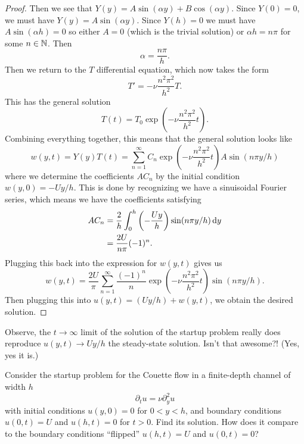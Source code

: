 \begin{framed}
\begin{proof}
Then we see that $Y(y)=A\sin(\alpha y)+B\cos(\alpha y)$. Since $Y(0)=0$,
we must have $Y(y)=A\sin(\alpha y)$. Since $Y(h)=0$ we must have
$A\sin(\alpha h)=0$ so either $A=0$ (which is the trivial solution) or
$\alpha h=n\pi$ for some $n\in\mathbb{N}$. Then
\begin{equation}
\alpha = \frac{n\pi}{h}.
\end{equation}
Then we return to the $T$ differential equation, which now takes the
form
\begin{equation}
T' = -\nu\frac{n^{2}\pi^{2}}{h^{2}}T.
\end{equation}
This has the general solution
\begin{equation}
T(t)=T_{0}\exp\left(-\nu\frac{n^{2}\pi^{2}}{h^{2}}t\right).
\end{equation}
Combining everything together, this means that the general solution
looks like
\begin{equation}
w(y,t)=Y(y)T(t)=\sum^{\infty}_{n=1}C_{n}\exp\left(-\nu\frac{n^{2}\pi^{2}}{h^{2}}t\right)A\sin(n\pi y/h)
\end{equation}
where we determine the coefficients $AC_{n}$ by the initial condition
$w(y,0)=-Uy/h$. This is done by recognizing we have a sinuisoidal
Fourier series, which means we have the coefficients satisfying
\begin{subequations}
  \begin{align}
AC_{n} &= \frac{2}{h}\int^{h}_{0}\left(-\frac{Uy}{h}\right)\sin(n\pi y/h)\,\mathrm{d} y\\
&=\frac{2 U}{n\pi}(-1)^{n}.
  \end{align}
\end{subequations}
Plugging this back into the expression for $w(y,t)$ gives us
\begin{equation}
w(y,t) = \frac{2U}{\pi}\sum^{\infty}_{n=1}\frac{(-1)^{n}}{n}\exp\left(-\nu\frac{n^{2}\pi^{2}}{h^{2}}t\right)\sin(n\pi y/h).
\end{equation}
Then plugging this into $u(y,t) = (Uy/h)+w(y,t)$, we obtain the
desired solution.
\end{proof}

\begin{remark}
Observe, the $t\to\infty$ limit of the solution of the startup problem
really does reproduce $u(y,t)\to Uy/h$ the steady-state
solution. Isn't that awesome?! (Yes, yes it is.)
\end{remark}

\begin{xca}\label{xca:fall2026:lec9:flipped-couette-flow-finite-depth}
Consider the startup problem for the Couette flow in a finite-depth
channel of width $h$
\begin{equation}
\partial_{t}u=\nu\partial_{y}^{2}u
\end{equation}
with initial conditions $u(y,0)=0$ for $0<y<h$, and boundary
conditions $u(0,t)=U$ and $u(h,t)=0$ for $t>0$. Find its solution. How
does it compare to the boundary conditions ``flipped'' $u(h,t)=U$ and $u(0,t)=0$?
\end{xca}


\end{framed}
